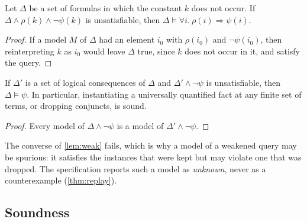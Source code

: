 \begin{lemma}[Generalization]\label{lem:gen}
Let $\Delta$ be a set of formulas in which the constant $k$ does not occur. If
$\Delta\wedge\rho(k)\wedge\neg\psi(k)$ is unsatisfiable, then
$\Delta\models\forall i.\ \rho(i)\Rightarrow\psi(i)$.
\end{lemma}
\begin{proof}
If a model $M$ of $\Delta$ had an element $i_0$ with $\rho(i_0)$ and $\neg\psi(i_0)$, then
reinterpreting $k$ as $i_0$ would leave $\Delta$ true, since $k$ does not occur in it, and
satisfy the query.
\end{proof}

\begin{lemma}[Weakening]\label{lem:weak}
If $\Delta'$ is a set of logical consequences of $\Delta$ and $\Delta'\wedge\neg\psi$ is
unsatisfiable, then $\Delta\models\psi$. In particular, instantiating a universally quantified
fact at any finite set of terms, or dropping conjuncts, is sound.
\end{lemma}
\begin{proof}
Every model of $\Delta\wedge\neg\psi$ is a model of $\Delta'\wedge\neg\psi$.
\end{proof}

The converse of \cref{lem:weak} fails, which is why a model of a weakened query may be
spurious: it satisfies the instances that were kept but may violate one that was dropped. The
specification reports such a model as \emph{unknown}, never as a counterexample
(\cref{thm:replay}).

\subsection{Soundness}

